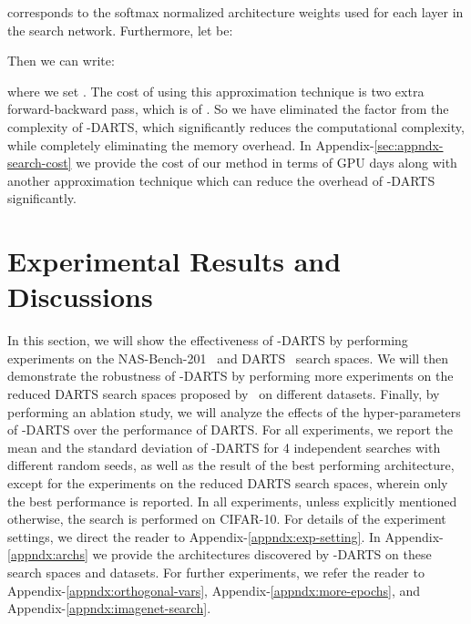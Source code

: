 \documentclass{article} \usepackage{fancyhdr, iclr2023_conference, times}
\newcommand{\mydarts}{-DARTS\xspace}
\begin{document}
corresponds to the softmax normalized architecture weights used for each layer in the search network. Furthermore, let  be:

Then we can write:

where we set . The cost of using this approximation technique is two extra forward-backward pass, which is of . So we have eliminated the  factor from the complexity of \mydarts, which significantly reduces the computational complexity, while completely eliminating the memory overhead. In Appendix-\ref{sec:appndx-search-cost} we provide the cost of our method in terms of GPU days along with another approximation technique which can reduce the overhead of \mydarts significantly.
\section{Experimental Results and Discussions}
In this section, we will show the effectiveness of \mydarts by performing experiments on the NAS-Bench-201~\citep{DBLP:conf/iclr/Dong020} and DARTS~\citep{DBLP:conf/iclr/LiuSY19} search spaces. We will then demonstrate the robustness of \mydarts by performing more experiments on the reduced DARTS search spaces proposed by~\citep{DBLP:conf/iclr/ZelaESMBH20} on different datasets. Finally, by performing an ablation study, we will analyze the effects of the hyper-parameters of \mydarts over the performance of DARTS. For all experiments, we report the mean and the standard deviation of \mydarts for 4 independent searches with different random seeds, as well as the result of the best performing architecture, except for the experiments on the reduced DARTS search spaces, wherein only the best performance is reported. In all experiments, unless explicitly mentioned otherwise, the search is performed on CIFAR-10. For details of the experiment settings, we direct the reader to Appendix-\ref{appndx:exp-setting}. In Appendix-\ref{appndx:archs} we provide the architectures discovered by \mydarts on these search spaces and datasets. For further experiments, we refer the reader to Appendix-\ref{appndx:orthogonal-vars}, Appendix-\ref{appndx:more-epochs}, and Appendix-\ref{appndx:imagenet-search}.
\end{document}
